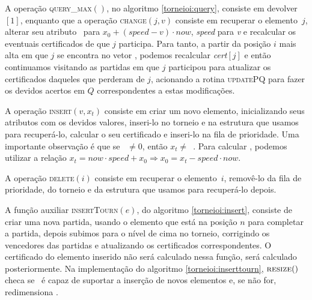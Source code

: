 A operação \textsc{query\_max}$()$, no algoritmo
\ref{torneioi:query}, consiste em devolver \torneio$[1]$, enquanto
que a operação \textsc{change}$(j, v)$ consiste em recuperar o
elemento~$j$, alterar seu atributo \initv~para
$x_0+(\mathit{speed}-v)\cdot now$, \textit{speed} para \textit{v} e
recalcular os eventuais certificados de que $j$ participa. Para
tanto, a partir da posição $i$ mais alta em que $j$ se encontra no
vetor \torneio, podemos recalcular \textit{cert}$[j]$ e então
continuamos visitando as partidas em que $j$ participou para
atualizar os certificados daqueles que perderam de $j$, acionando a
rotina \textsc{updatePQ} para fazer os devidos acertos em $Q$
correspondentes a estas modificações.





A operação \textsc{insert}$(v, x_t)$ consiste em criar um novo elemento,
inicializando seus atributos com os devidos valores,
inseri-lo no torneio e na estrutura que usamos para recuperá-lo,
calcular o seu certificado e inseri-lo na fila de prioridade.
Uma importante observação é que se \now~$\neq 0$, então $x_t
\neq$~\initv. Para calcular \initv, podemos utilizar a relação
$x_t = now\cdot speed + x_0 \Rightarrow x_0 = x_t - speed\cdot
now$.



A operação \textsc{delete}$(i)$ consiste em recuperar o
elemento~$i$, removê-lo da fila de prioridade, do torneio e da
estrutura que usamos para recuperá-lo depois.



A função auxiliar \textsc{insertTourn}$(e)$, do algoritmo
\ref{torneioi:insert}, consiste de criar uma nova partida, usando o
elemento que está na posição $n$ para completar a partida, depois
subimos para o nível de cima no torneio, corrigindo os vencedores
das partidas e atualizando os certificados correspondentes. O
certificado do elemento inserido não será calculado nessa função,
será calculado posteriormente. Na implementação do algoritmo
\ref{torneioi:inserttourn}, $\textsc{resize}()$ checa se \torneio~é
capaz de suportar a inserção de novos elementos e, se não for,
redimensiona \torneio.



